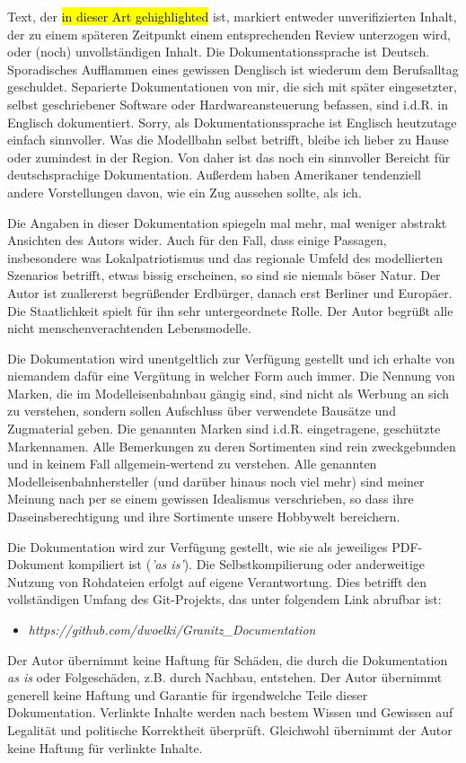 {	Text, der \hl{in dieser Art gehighlighted} ist, markiert entweder unverifizierten Inhalt, der zu einem sp\"ateren Zeitpunkt einem entsprechenden Review unterzogen wird, oder (noch) unvollst\"andigen Inhalt.
	Die Dokumentationssprache ist Deutsch.
	Sporadisches Aufflammen eines gewissen Denglisch ist wiederum dem Berufsalltag geschuldet.
	Separierte Dokumentationen von mir, die sich mit sp\"ater eingesetzter, selbst geschriebener Software oder Hardwareansteuerung befassen, sind i.d.R. in Englisch dokumentiert.
	Sorry, als Dokumentationssprache ist Englisch heutzutage einfach sinnvoller.
	Was die Modellbahn selbst betrifft, bleibe ich lieber zu Hause oder zumindest in der Region.
	Von daher ist das noch ein sinnvoller Bereicht f\"ur deutschsprachige Dokumentation.
	Au{\ss}erdem haben Amerikaner tendenziell andere Vorstellungen davon, wie ein Zug aussehen sollte, als ich.
	
	Die Angaben in dieser Dokumentation spiegeln mal mehr, mal weniger abstrakt Ansichten des Autors wider.
	Auch f\"ur den Fall, dass einige Passagen, insbesondere was Lokalpatriotismus und das regionale Umfeld des modellierten Szenarios betrifft, etwas bissig erscheinen, so sind sie niemals b\"oser Natur.
	Der Autor ist zuallererst begr\"u{\ss}ender Erdb\"urger, danach erst Berliner und Europ\"aer.
	Die Staatlichkeit spielt f\"ur ihn sehr untergeordnete Rolle.
	Der Autor begr\"u{\ss}t alle nicht menschenverachtenden Lebensmodelle.
	
	Die Dokumentation wird unentgeltlich zur Verf\"ugung gestellt und ich erhalte von niemandem daf\"ur eine Verg\"utung in welcher Form auch immer.
	Die Nennung von Marken, die im Modelleisenbahnbau g\"angig sind, sind nicht als Werbung an sich zu verstehen, sondern sollen Aufschluss \"uber verwendete Baus\"atze und Zugmaterial geben.
	Die genannten Marken sind i.d.R. eingetragene, gesch\"utzte Markennamen.
	Alle Bemerkungen zu deren Sortimenten sind rein zweckgebunden und in keinem Fall allgemein-wertend zu verstehen.
	Alle genannten Modelleisenbahnhersteller (und dar\"uber hinaus noch viel mehr) sind meiner Meinung nach per se einem gewissen Idealismus verschrieben, so dass ihre Daseinsberechtigung und ihre Sortimente unsere Hobbywelt bereichern.
	
	Die Dokumentation wird zur Verf\"ugung gestellt, wie sie als jeweiliges PDF-Dokument kompiliert ist (\textit{'as is'}).
	Die Selbstkompilierung oder anderweitige Nutzung von Rohdateien erfolgt auf eigene Verantwortung.
	Dies betrifft den vollst\"andigen Umfang des Git-Projekts, das unter folgendem Link abrufbar ist:
	\begin{itemize}
		\item[] \textit{https://github.com/dwoelki/Granitz\_Documentation}
	\end{itemize}
	Der Autor \"ubernimmt keine Haftung f\"ur Sch\"aden, die durch die Dokumentation \textit{as is} oder Folgesch\"aden, z.B. durch Nachbau, entstehen.
	Der Autor \"ubernimmt generell keine Haftung und Garantie f\"ur irgendwelche Teile dieser Dokumentation.
	Verlinkte Inhalte werden nach bestem Wissen und Gewissen auf Legalit\"at und politische Korrektheit \"uberpr\"uft.
	Gleichwohl \"ubernimmt der Autor keine Haftung f\"ur verlinkte Inhalte.
	
}
